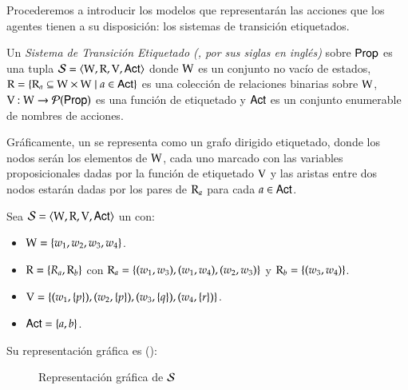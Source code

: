 Procederemos a introducir los modelos que representarán las acciones que los agentes tienen a su disposición: 
los sistemas de transición etiquetados.

\begin{definicion}
    Un \emph{Sistema de Transición Etiquetado (\lts, por sus siglas en inglés)} sobre ${\rm \sf Prop}$ es una tupla $\mathcal{S} = \langle \mathrm{W}, \mathrm{R}, \mathrm{V}, {\rm \sf Act} \rangle$ 
    donde $\mathrm{W}$ es un conjunto no vacío de estados, $\mathrm{R} = \{\mathrm{R}_a \subseteq \mathrm{W} \times \mathrm{W} \mid a \in {\rm \sf Act}\}$ es 
    una colección de relaciones binarias sobre $\mathrm{W}$, $\mathrm{V} : \mathrm{W} \to \mathcal{P}({\rm \sf Prop})$ es una función de etiquetado y ${\rm \sf Act}$ es un 
    conjunto enumerable de nombres de acciones.
\end{definicion}

Gráficamente, un \lts se representa como un grafo dirigido etiquetado, donde los nodos serán los elementos de $\mathrm{W}$, cada uno marcado con las variables proposicionales 
dadas por la función de etiquetado $\mathrm{V}$ y las aristas entre dos nodos estarán dadas por los pares de $\mathrm{R}_a$ para cada $a \in {\rm \sf Act}$.

\begin{ejemplo}\label{ejemplo:lts}
    Sea $\mathcal{S} = \langle \mathrm{W}, \mathrm{R}, \mathrm{V}, {\rm \sf Act} \rangle$ un \lts con:
    
    \begin{itemize}
        \item $\mathrm{W} = \{w_1, w_2, w_3, w_4\}$.
        \item $\mathrm{R} = \{R_a, \mathrm{R}_b\}$ con $\mathrm{R}_a = \{(w_1,w_3), (w_1,w_4), (w_2,w_3)\}$ y $\mathrm{R}_b = \{(w_3,w_4)\}$.
        \item $\mathrm{V} = \{(w_1, \{p\}), (w_2, \{p\}), (w_3, \{q\}), (w_4, \{r\})\}$.
        \item ${\rm \sf Act} = \{a, b\}$.
    \end{itemize}

    Su representación gráfica es ():
    \begin{figure}[h]
        \centering
        \caption{Representación gráfica de $\mathcal{S}$}
        \label{fig:lts}
    \end{figure}

\end{ejemplo}


